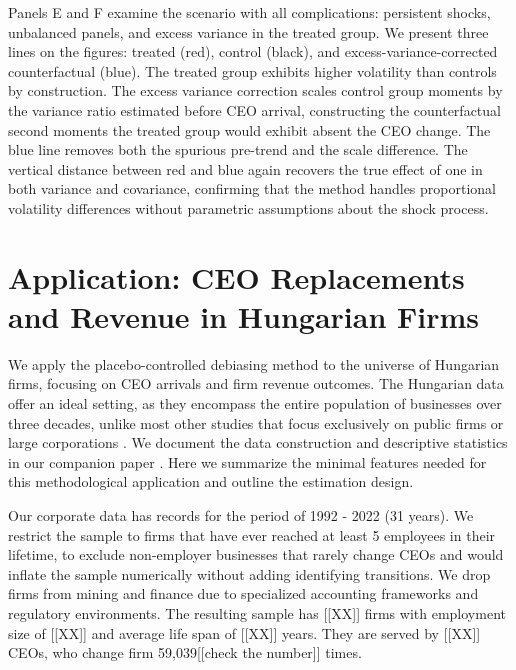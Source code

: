 \documentclass[11pt,a4paper]{article}
\begin{document}
Panels E and F examine the scenario with all complications: persistent shocks, unbalanced panels, and excess variance in the treated group. We present three lines on the figures: treated (red), control (black), and excess-variance-corrected counterfactual (blue). The treated group exhibits higher volatility than controls by construction. The excess variance correction scales control group moments by the variance ratio estimated before CEO arrival, constructing the counterfactual second moments the treated group would exhibit absent the CEO change. The blue line removes both the spurious pre-trend and the scale difference. The vertical distance between red and blue again recovers the true effect of one in both variance and covariance, confirming that the method handles proportional volatility differences without parametric assumptions about the shock process.

\section{Application: CEO Replacements and Revenue in Hungarian Firms}

We apply the placebo-controlled debiasing method to the universe of Hungarian firms, focusing on CEO arrivals and firm revenue outcomes. The Hungarian data offer an ideal setting, as they encompass the entire population of businesses over three decades, unlike most other studies that focus exclusively on public firms or large corporations \citep{Bertrand2003-io, crossland2011differences, quigley2015has}. We document the data construction and descriptive statistics in our companion paper \citep{ceo_value}. Here we summarize the minimal features needed for this methodological application and outline the estimation design.

Our corporate data has records for the period of 1992 - 2022 (31 years). We restrict the sample to firms that have ever reached at least 5 employees in their lifetime, to exclude non-employer businesses that rarely change CEOs and would inflate the sample numerically without adding identifying transitions. We drop firms from mining and finance due to specialized accounting frameworks and regulatory environments. The resulting sample has [[XX]] firms with employment size of [[XX]] and average life span of [[XX]] years. They are served by [[XX]] CEOs, who change firm 59,039[[check the number]] times. %
\end{document}
